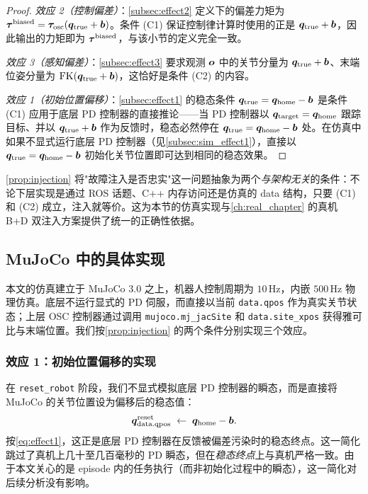 \begin{proof}
\emph{效应 2（控制偏差）}：\cref{subsec:effect2} 定义下的偏差力矩为 $\bm{\tau}^{\text{biased}} = \bm{\tau}_{\text{osc}}(\bm{q}_{\text{true}} + \bm{b})$。条件 (C1) 保证控制律计算时使用的正是 $\bm{q}_{\text{true}} + \bm{b}$，因此输出的力矩即为 $\bm{\tau}^{\text{biased}}$，与该小节的定义完全一致。

\emph{效应 3（感知偏差）}：\cref{subsec:effect3} 要求观测 $\bm{o}$ 中的关节分量为 $\bm{q}_{\text{true}} + \bm{b}$、末端位姿分量为 $\text{FK}(\bm{q}_{\text{true}} + \bm{b})$，这恰好是条件 (C2) 的内容。

\emph{效应 1（初始位置偏移）}：\cref{subsec:effect1} 的稳态条件 $\bm{q}_{\text{true}} = \bm{q}_{\text{home}} - \bm{b}$ 是条件 (C1) 应用于底层 PD 控制器的直接推论——当 PD 控制器以 $\bm{q}_{\text{target}} = \bm{q}_{\text{home}}$ 跟踪目标、并以 $\bm{q}_{\text{true}} + \bm{b}$ 作为反馈时，稳态必然停在 $\bm{q}_{\text{true}} = \bm{q}_{\text{home}} - \bm{b}$ 处。在仿真中如果不显式运行底层 PD 控制器（见\cref{subsec:sim_effect1}），直接以 $\bm{q}_{\text{true}} = \bm{q}_{\text{home}} - \bm{b}$ 初始化关节位置即可达到相同的稳态效果。\end{proof}

\cref{prop:injection} 将"故障注入是否忠实"这一问题抽象为两个\emph{与架构无关}的条件：不论下层实现是通过 ROS 话题、C++ 内存访问还是仿真的 data 结构，只要 (C1) 和 (C2) 成立，注入就等价。这为本节的仿真实现与\cref{ch:real_chapter} 的真机 B+D 双注入方案提供了统一的正确性依据。

\subsection{MuJoCo 中的具体实现}\label{subsec:sim_implementation}

本文的仿真建立于 MuJoCo 3.0 之上，机器人控制周期为 $10$\,Hz，内嵌 $500$\,Hz 物理仿真。底层不运行显式的 PD 伺服，而直接以当前 \texttt{data.qpos} 作为真实关节状态；上层 OSC 控制器通过调用 \texttt{mujoco.mj\_jacSite} 和 \texttt{data.site\_xpos} 获得雅可比与末端位置。我们按\cref{prop:injection} 的两个条件分别实现三个效应。

\subsubsection*{效应 1：初始位置偏移的实现}\label{subsec:sim_effect1}

在 \texttt{reset\_robot} 阶段，我们不显式模拟底层 PD 控制器的瞬态，而是直接将 MuJoCo 的关节位置设为偏移后的稳态值：
\begin{equation}
  \bm{q}_{\text{data.qpos}}^{\text{reset}} \;\leftarrow\; \bm{q}_{\text{home}} - \bm{b}.
  \label{eq:sim_reset}
\end{equation}
按\cref{eq:effect1}，这正是底层 PD 控制器在反馈被偏差污染时的稳态终点。这一简化跳过了真机上几十至几百毫秒的 PD 瞬态，但在\emph{稳态终点}上与真机严格一致。由于本文关心的是 episode 内的任务执行（而非初始化过程中的瞬态），这一简化对后续分析没有影响。

